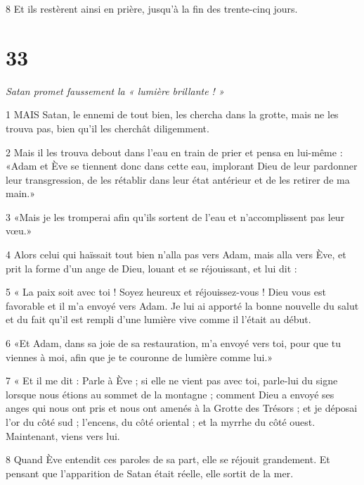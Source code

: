 \par 8 Et ils restèrent ainsi en prière, jusqu'à la fin des trente-cinq jours.

\chapter{33}

\par \textit{Satan promet faussement la « lumière brillante ! »}

\par 1 MAIS Satan, le ennemi de tout bien, les chercha dans la grotte, mais ne les trouva pas, bien qu'il les cherchât diligemment.

\par 2 Mais il les trouva debout dans l'eau en train de prier et pensa en lui-même : «Adam et Ève se tiennent donc dans cette eau, implorant Dieu de leur pardonner leur transgression, de les rétablir dans leur état antérieur et de les retirer de ma main.»

\par 3 «Mais je les tromperai afin qu'ils sortent de l'eau et n'accomplissent pas leur vœu.»

\par 4 Alors celui qui haïssait tout bien n'alla pas vers Adam, mais alla vers Ève, et prit la forme d'un ange de Dieu, louant et se réjouissant, et lui dit :

\par 5 « La paix soit avec toi ! Soyez heureux et réjouissez-vous ! Dieu vous est favorable et il m'a envoyé vers Adam. Je lui ai apporté la bonne nouvelle du salut et du fait qu’il est rempli d’une lumière vive comme il l’était au début.

\par 6 «Et Adam, dans sa joie de sa restauration, m'a envoyé vers toi, pour que tu viennes à moi, afin que je te couronne de lumière comme lui.»

\par 7 « Et il me dit : Parle à Ève ; si elle ne vient pas avec toi, parle-lui du signe lorsque nous étions au sommet de la montagne ; comment Dieu a envoyé ses anges qui nous ont pris et nous ont amenés à la Grotte des Trésors ; et je déposai l'or du côté sud ; l'encens, du côté oriental ; et la myrrhe du côté ouest. Maintenant, viens vers lui.

\par 8 Quand Ève entendit ces paroles de sa part, elle se réjouit grandement. Et pensant que l'apparition de Satan était réelle, elle sortit de la mer.

